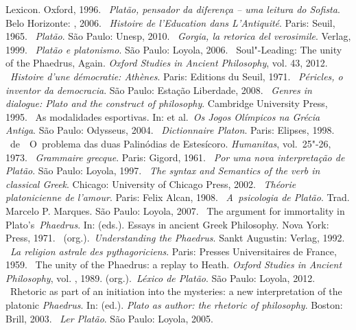 \begin{bibliohedra}
{  Lexicon}. Oxford, 1996.
~\emph{Platão, pensador da diferença -- uma leitura do
  Sofista}. Belo Horizonte: , 2006.
~\emph{Histoire de l'Education dans L'Antiquité}. Paris:
  Seuil, 1965.
~\emph{Platão}. São Paulo: Unesp, 2010.
~\emph{Gorgia, la retorica del verosimile}. Verlag, 1999.
~\emph{Platão e platonismo}. São Paulo: Loyola, 2006.
~Soul"-Leading: The unity of the Phaedrus, Again. \emph{Oxford Studies in Ancient Philosophy}, vol. 43, 2012.
~\emph{Histoire d'une démocratie: Athènes}. Paris: Editions
  du Seuil, 1971.
~\emph{Péricles, o inventor da democracia}. São Paulo:
  Estação Liberdade, 2008.
~\emph{Genres in dialogue: Plato and the
  construct of philosophy}. Cambridge University Press, 1995.
~As modalidades esportivas. In:  et al.~\emph{Os Jogos
  Olímpicos na Grécia Antiga}. São Paulo: Odysseus, 2004.
~\emph{Dictionnaire Platon}. Paris:
  Elipses, 1998.
~de~~O~problema das duas Palinódias de
  Estesícoro. \emph{Humanitas}, vol.~25"-26, 1973.
~\emph{Grammaire grecque}. Paris: Gigord, 1961.
~\emph{Por uma nova interpretação de Platão}. São Paulo:
  Loyola, 1997.
~\emph{The syntax and Semantics of the verb in classical
  Greek}. Chicago: University of Chicago Press, 2002.
~\emph{Théorie platonicienne de l'amour}. Paris: Felix Alcan,
  1908.
~\emph{A~psicologia de Platão}. Trad. Marcelo P. Marques. São Paulo: Loyola, 2007.
~The argument for immortality in
  Plato's~\emph{Phaedrus}. In:  (eds.). Essays in ancient Greek Philosophy.
  Nova York:  Press, 1971.
~(org.).~\emph{Understanding the Phaedrus}. Sankt Augustin:
  Verlag, 1992.
~\emph{La religion astrale des pythagoriciens}. Paris:
  Presses Universitaires de France, 1959.
~The unity of the Phaedrus: a replay to Heath. \emph{Oxford Studies in Ancient Philosophy}, vol. , 1989.
 (org.).~\emph{Léxico de Platão}. São Paulo: Loyola,
  2012.
~Rhetoric as part of an initiation into the
  mysteries: a new interpretation of the platonic \emph{Phaedrus}. In:  (ed.). \emph{Plato as
  author: the rhetoric of philosophy}. Boston: Brill, 2003.
~\emph{Ler Platão}. São Paulo: Loyola, 2005.

\end{bibliohedra}
